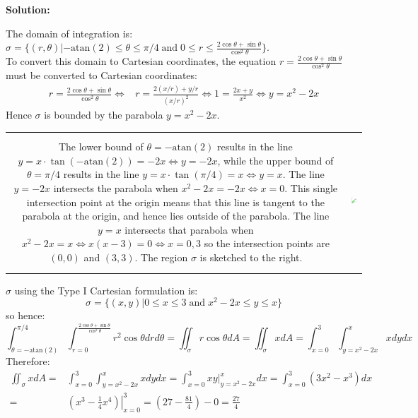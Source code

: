 \documentclass{article}
\newcommand{\atan}{\text{atan}}
\newcommand{\at}[1]{\left. #1 \right|}
\newcommand{\dr}[1]{\textcolor{dark_red}{#1}}
\begin{document}
\vspace{5mm}
\dr{\textbf{Solution:}}

\dr{
The domain of integration is: \(\sigma = \{(r,\theta) | -\atan(2) \leq \theta \leq \pi/4 \;\text{and}\; 0 \leq r \leq \frac{2\cos\theta + \sin\theta}{\cos^2\theta}\}\). \\
To convert this domain to Cartesian coordinates, the equation \(r = \frac{2\cos\theta + \sin\theta}{\cos^2\theta}\) must be converted to Cartesian coordinates:
\begin{align*}
r = \frac{2\cos\theta + \sin\theta}{\cos^2\theta} 
\iff & r = \frac{2(x/r) + y/r}{(x/r)^2} 
\iff 1 = \frac{2x + y}{x^2} 
\iff y = x^2 - 2x
\end{align*}
Hence \(\sigma\) is bounded by the parabola \(y = x^2 - 2x\). \\
\begin{tabular}{cc}
\parbox{0.6\textwidth}{
The lower bound of \(\theta = -\atan(2)\) results in the line \(y = x \cdot \tan(-\atan(2)) = -2x \iff y = -2x\), while the upper bound of \(\theta = \pi/4\) results in the line \(y = x \cdot \tan(\pi/4) = x \iff y = x\). 
The line \(y = -2x\) intersects the parabola when \(x^2 - 2x = -2x \iff x = 0\). This single intersection point at the origin means that this line is tangent to the parabola at the origin, and hence lies outside of the parabola. The line \(y = x\) intersects that parabola when \(x^2 - 2x = x \iff x(x - 3) = 0 \iff x = 0, 3\) so the intersection points are \((0,0)\) and \((3,3)\). The region \(\sigma\) is sketched to the right. 
} & \parbox{0.4\textwidth}{
\includegraphics[height = 5cm]{Test_bench_part_3_images/Test_bench_part_3_Solutions_image_1}
}
\end{tabular}
\(\sigma\) using the Type I Cartesian formulation is:
\[\sigma = \{(x,y) | 0 \leq x \leq 3 \;\text{and}\; x^2 - 2x \leq y \leq x\}\]
so hence:
\[\int_{\theta = -\atan(2)}^{\pi/4}\int_{r = 0}^{\frac{2\cos\theta + \sin\theta}{\cos^2\theta}} r^2\cos\theta dr d\theta
= \iint_{\sigma} r\cos\theta dA = \iint_{\sigma} x dA = 
\int_{x = 0}^3 \int_{y = x^2 - 2x}^{x} x dydx\]
Therefore:
\begin{align*}
\iint_{\sigma} x dA = & \int_{x = 0}^3 \int_{y = x^2 - 2x}^{x} x dydx 
= \int_{x = 0}^3 \at{xy}_{y = x^2 - 2x}^{x} dx 
= \int_{x = 0}^3 (3x^2 - x^3)dx \\
= & \at{(x^3 - \frac{1}{4}x^4)}_{x = 0}^3 
= (27 - \frac{81}{4}) - 0 = \frac{27}{4}
\end{align*}
}
\end{document}
